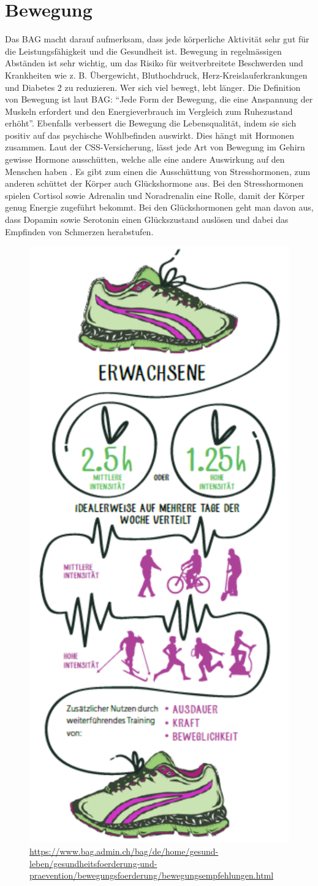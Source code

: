 \section{Bewegung}
\authortoc{\bastian}{\sectionident}
Das BAG macht darauf aufmerksam, dass jede körperliche Aktivität sehr gut für die Leistungsfähigkeit und die Gesundheit ist. Bewegung in regelmässigen Abständen ist sehr wichtig, um das Risiko für weitverbreitete Beschwerden und Krankheiten wie z. B. Übergewicht, Bluthochdruck, Herz-Kreislauferkrankungen und Diabetes 2 zu reduzieren.
\newline
Wer sich viel bewegt, lebt länger. Die Definition von Bewegung ist laut BAG: “Jede Form der Bewegung, die eine Anspannung der Muskeln erfordert und den Energieverbrauch im Vergleich zum Ruhezustand erhöht”.
\newline
Ebenfalls verbessert die Bewegung die Lebensqualität, indem sie sich positiv auf das psychische Wohlbefinden auswirkt. Dies hängt mit Hormonen zusammen. Laut der CSS-Versicherung, lässt jede Art von Bewegung im Gehirn gewisse Hormone ausschütten, welche alle eine andere Auswirkung auf den Menschen haben \cite{hormone-bei-bewegung}. Es gibt zum einen die Ausschüttung von Stresshormonen, zum anderen schüttet der Körper auch Glückshormone aus. Bei den Stresshormonen spielen Cortisol sowie Adrenalin und Noradrenalin eine Rolle, damit der Körper genug Energie zugeführt bekommt. Bei den Glückshormonen geht man davon aus, dass Dopamin sowie Serotonin einen Glückszustand auslösen und dabei das Empfinden von Schmerzen herabstufen.
\newline
\begin{figure}[H]
  \centering
  \includegraphics[width=0.38\linewidth]{./images/bewegungsempfehlungen-ew-dt.png}
  \caption{Grafik vom BAG zur Bewegungsempfehlung von Erwachsenen Menschen.}
  \label{fig:bewegungsempfehlungen}
  \caption*{\url{https://www.bag.admin.ch/bag/de/home/gesund-leben/gesundheitsfoerderung-und-praevention/bewegungsfoerderung/bewegungsempfehlungen.html}}
\end{figure}
